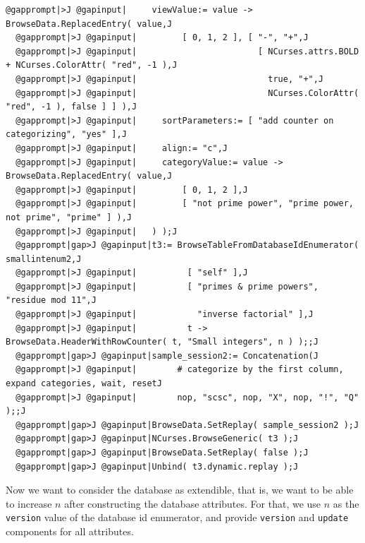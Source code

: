 \documentclass[a4paper,11pt]{report}
\begin{document}
{{\begin{Verbatim}[commandchars=@|J,fontsize=\small,frame=single,label=Example]
  @gapprompt|>J @gapinput|     viewValue:= value -> BrowseData.ReplacedEntry( value,J
  @gapprompt|>J @gapinput|         [ 0, 1, 2 ], [ "-", "+",J
  @gapprompt|>J @gapinput|                        [ NCurses.attrs.BOLD + NCurses.ColorAttr( "red", -1 ),J
  @gapprompt|>J @gapinput|                          true, "+",J
  @gapprompt|>J @gapinput|                          NCurses.ColorAttr( "red", -1 ), false ] ] ),J
  @gapprompt|>J @gapinput|     sortParameters:= [ "add counter on categorizing", "yes" ],J
  @gapprompt|>J @gapinput|     align:= "c",J
  @gapprompt|>J @gapinput|     categoryValue:= value -> BrowseData.ReplacedEntry( value,J
  @gapprompt|>J @gapinput|         [ 0, 1, 2 ],J
  @gapprompt|>J @gapinput|         [ "not prime power", "prime power, not prime", "prime" ] ),J
  @gapprompt|>J @gapinput|   ) );J
  @gapprompt|gap>J @gapinput|t3:= BrowseTableFromDatabaseIdEnumerator( smallintenum2,J
  @gapprompt|>J @gapinput|          [ "self" ],J
  @gapprompt|>J @gapinput|          [ "primes & prime powers", "residue mod 11",J
  @gapprompt|>J @gapinput|            "inverse factorial" ],J
  @gapprompt|>J @gapinput|          t -> BrowseData.HeaderWithRowCounter( t, "Small integers", n ) );;J
  @gapprompt|gap>J @gapinput|sample_session2:= Concatenation(J
  @gapprompt|>J @gapinput|        # categorize by the first column, expand categories, wait, resetJ
  @gapprompt|>J @gapinput|        nop, "scsc", nop, "X", nop, "!", "Q" );;J
  @gapprompt|gap>J @gapinput|BrowseData.SetReplay( sample_session2 );J
  @gapprompt|gap>J @gapinput|NCurses.BrowseGeneric( t3 );J
  @gapprompt|gap>J @gapinput|BrowseData.SetReplay( false );J
  @gapprompt|gap>J @gapinput|Unbind( t3.dynamic.replay );J
\end{Verbatim}
 Now we want to consider the database as extendible, that is, we want to be
able to increase $n$ after constructing the database attributes. For that, we use $n$ as the \texttt{version} value of the database id enumerator, and provide \texttt{version} and \texttt{update} components for all attributes. 

}}
\end{document}
